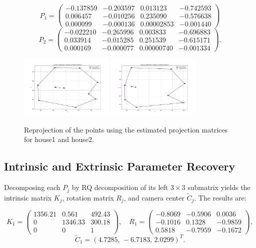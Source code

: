 \[
P_1 = \begin{pmatrix}
-0.137859 & -0.203597 & 0.013123 & -0.742593 \\
 0.006457 & -0.010256 & 0.235090 & -0.576638 \\
 0.000099 & -0.000136 & 0.00002853 & -0.001440
\end{pmatrix}
\]
\[
P_2 = \begin{pmatrix}
-0.022210 & -0.265996 & 0.003833 & -0.696883 \\
 0.033914 & -0.015285 & 0.251539 & -0.615171 \\
 0.000169 & -0.000077 & 0.00000740 & -0.001334
\end{pmatrix}.
\]


\begin{figure}[H]
  \centering
  \includegraphics[width=0.4\textwidth]{"../Assets/img1.png"}
  \includegraphics[width=0.4\textwidth]{"../Assets/img2.png"}
  \caption{Reprojection of the points using the estimated projection matrices for house1 and house2.}
  \label{fig:reproj}
\end{figure}

\subsection{Intrinsic and Extrinsic Parameter Recovery}
Decomposing each $P_j$ by RQ decomposition of its left $3\times3$ submatrix yields the intrinsic matrix $K_j$, rotation matrix $R_j$, and camera center $\tilde C_j$. The results are:

\[
K_1 = \begin{pmatrix}
1356.21 & 0.561 & 492.43 \\
0 & 1346.33 & 300.18 \\
0 & 0 & 1
\end{pmatrix},
\quad
R_1 = \begin{pmatrix}
-0.8069 & -0.5906 & 0.0036 \\
-0.1016 & 0.1328 & -0.9859 \\
 0.5818 & -0.7959 & -0.1672
\end{pmatrix},
\]
\[
\tilde C_1 = (4.7285,\,-6.7183,\,2.0299)^T.
\]

